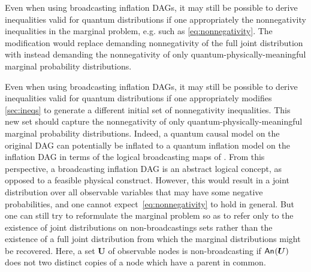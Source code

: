 

Even when using broadcasting inflation DAGs, it may still be possible to derive inequalities valid for quantum distributions if one appropriately the nonnegativity inequalities in the marginal problem, e.g. such as \cref{eq:nonnegativity}. The modification would replace demanding nonnegativity of the full joint distribution with instead demanding the nonnegativity of only quantum-physically-meaningful marginal probability distributions. 

Even when using broadcasting inflation DAGs, it may still be possible to derive inequalities valid for quantum distributions if one appropriately modifies \cref{sec:ineqs} to generate a different initial set of nonnegativity inequalities. This new set should capture the nonnegativity of only quantum-physically-meaningful marginal probability distributions. Indeed, a quantum causal model on the original DAG can potentially be inflated to a quantum inflation model on the inflation DAG in terms of the logical broadcasting maps of \citet{Coecke2011}. From this perspective, a broadcasting inflation DAG is an abstract logical concept, as opposed to a feasible physical construct. However, this would result in a joint distribution over all observable variables that may have some negative probabilities, and one cannot expect~\cref{eq:nonnegativity} to hold in general. But one can still try to reformulate the marginal problem so as to refer only to the existence of joint distributions on non-broadcastings sets rather than the existence of a full joint distribution from which the marginal distributions might be recovered. Here, a set $\bm{U}$ of observable nodes is non-broadcasting if ${\mathsf{An}_{}}\lparen\bm{U}\rparen$ does not two distinct copies of a node which have a parent in common.

